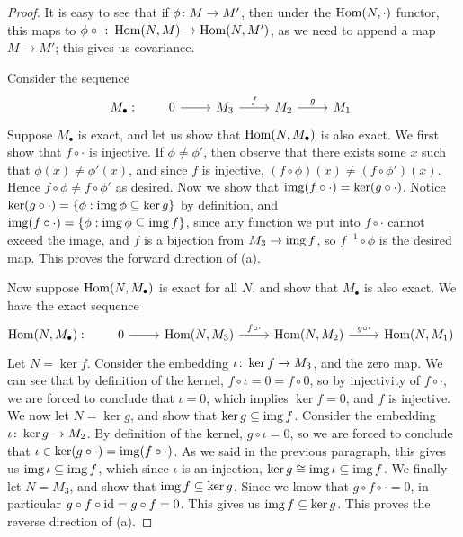 \begin{proof}
    It is easy to see that if \(\phi\colon M\to M'\),
    then under the \(\operatorname{Hom}(N,\cdot)\) functor,
    this maps to \(\phi\circ\cdot\colon\operatorname{Hom}(N,M)\to\operatorname{Hom}(N,M')\),
    as we need to append a map \(M \to M'\);
    this gives us covariance.

    Consider the sequence
    \begin{equation*}
        M_\bullet: \qquad
        \begin{tikzcd}
            0 \arrow{r} & M_3 \arrow{r}{f} & M_2 \arrow{r}{g} & M_1
        \end{tikzcd}
    \end{equation*}
    Suppose \(M_\bullet\) is exact, and let us show that \(\operatorname{Hom}(N,M_\bullet)\) is also exact.
    We first show that \(f\circ\cdot\) is injective.
    If \(\phi\neq\phi'\), then observe that there exists some \(x\) such that \(\phi(x) \neq \phi'(x)\),
    and since \(f\) is injective, \((f\circ\phi)(x) \neq (f\circ\phi')(x)\).
    Hence \(f\circ\phi \neq f\circ\phi'\) as desired.
    Now we show that \(\operatorname{img}(f\circ\cdot) = \ker(g\circ\cdot)\).
    Notice \(\ker(g\circ\cdot) = \{\phi: \operatorname{img}\phi \subseteq \ker g\}\) by definition,
    and \(\operatorname{img}(f\circ\cdot) = \{\phi: \operatorname{img}\phi \subseteq \operatorname{img} f\}\),
    since any function we put into \(f\circ\cdot\) cannot exceed the image,
    and \(f\) is a bijection from \(M_3 \to \operatorname{img} f\),
    so \(f^{-1}\circ\phi\) is the desired map.
    This proves the forward direction of (a).

    Now suppose \(\operatorname{Hom}(N,M_\bullet)\) is exact for all \(N\),
    and show that \(M_\bullet\) is also exact.
    We have the exact sequence
    \begin{equation*}
        \Hom(N,M_\bullet): \qquad
        \begin{tikzcd}
            0 \arrow{r} & \Hom(N,M_3) \arrow{r}{f\circ\cdot} &
            \Hom(N,M_2) \arrow{r}{g\circ\cdot} & \Hom(N,M_1)
        \end{tikzcd}
    \end{equation*}
    Let \(N = \ker f\).
    Consider the embedding \(\iota\colon\ker f\to M_3\), and the zero map.
    We can see that by definition of the kernel, \(f\circ\iota = 0 = f\circ 0\),
    so by injectivity of \(f\circ\cdot\),
    we are forced to conclude that \(\iota = 0\),
    which implies \(\ker f = 0\), and \(f\) is injective.
    We now let \(N = \ker g\), and show that \(\ker g \subseteq \operatorname{img} f\).
    Consider the embedding \(\iota\colon\ker g\to M_2\).
    By definition of the kernel, \(g\circ\iota = 0\),
    so we are forced to conclude that \(\iota \in \ker(g\circ\cdot) = \operatorname{img}(f\circ\cdot)\).
    As we said in the previous paragraph, this gives us \(\operatorname{img}\iota \subseteq \operatorname{img} f\),
    which since \(\iota\) is an injection, \(\ker g \cong \operatorname{img}\iota \subseteq \operatorname{img} f\).
    We finally let \(N = M_3\), and show that \(\operatorname{img} f \subseteq \ker g\).
    Since we know that \(g\circ f\circ\cdot = 0\),
    in particular \(g\circ f\circ\operatorname{id} = g\circ f = 0\).
    This gives us \(\operatorname{img} f \subseteq \ker g\).
    This proves the reverse direction of (a).


\end{proof}

